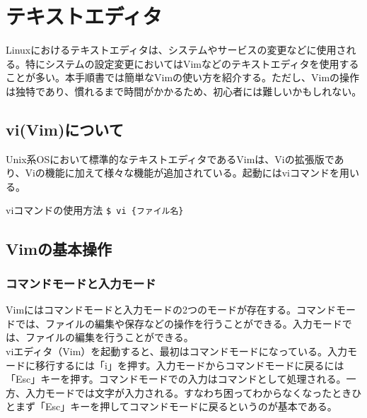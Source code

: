 \documentclass[a4paper, 11pt, dvipdfmx]{jsarticle}
\begin{document}
\section{テキストエディタ}
Linuxにおけるテキストエディタは、システムやサービスの変更などに使用される。特にシステムの設定変更においてはVimなどのテキストエディタを使用することが多い。本手順書では簡単なVimの使い方を紹介する。ただし、Vimの操作は独特であり、慣れるまで時間がかかるため、初心者には難しいかもしれない。\\
\subsection{vi(Vim)について}
  Unix系OSにおいて標準的なテキストエディタであるVimは、Viの拡張版であり、Viの機能に加えて様々な機能が追加されている。起動にはviコマンドを用いる。\\
  \begin{commandbox}{viコマンドの使用方法}
    \verb|$ vi {ファイル名}|
  \end{commandbox}
\subsection{Vimの基本操作}
\subsubsection{コマンドモードと入力モード}
Vimにはコマンドモードと入力モードの2つのモードが存在する。コマンドモードでは、ファイルの編集や保存などの操作を行うことができる。入力モードでは、ファイルの編集を行うことができる。\\
viエディタ（Vim）を起動すると、最初はコマンドモードになっている。入力モードに移行するには「i」を押す。入力モードからコマンドモードに戻るには「Esc」キーを押す。コマンドモードでの入力はコマンドとして処理される。一方、入力モードでは文字が入力される。すなわち困ってわからなくなったときひとまず「Esc」キーを押してコマンドモードに戻るというのが基本である。
\end{document}
